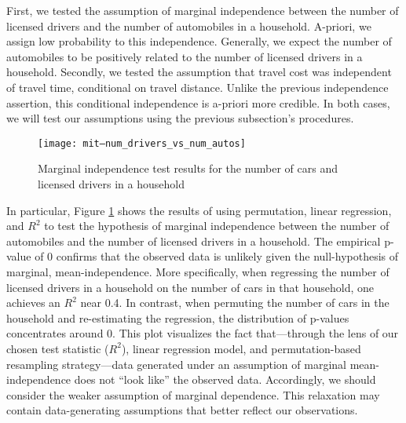 First, we tested the assumption of marginal independence between the number of licensed drivers and the number of automobiles in a household.
A-priori, we assign low probability to this independence.
Generally, we expect the number of automobiles to be positively related to the number of licensed drivers in a household.
Secondly, we tested the assumption that travel cost was independent of travel time, conditional on travel distance.
Unlike the previous independence assertion, this conditional independence is a-priori more credible.
In both cases, we will test our assumptions using the previous subsection's procedures.

\begin{figure}
   \centering
   \texttt{[image: mit--num\_drivers\_vs\_num\_autos]}
   \caption{Marginal independence test results for the number of cars and licensed drivers in a household}
   \label{fig:marginal-independence-test}
\end{figure}

In particular, Figure \ref{fig:marginal-independence-test} shows the results of using permutation, linear regression, and $R^2$ to test the hypothesis of marginal independence between the number of automobiles and the number of licensed drivers in a household.
The empirical p-value of 0 confirms that the observed data is unlikely given the null-hypothesis of marginal, mean-independence.
More specifically, when regressing the number of licensed drivers in a household on the number of cars in that household, one achieves an $R^2$ near 0.4.
In contrast, when permuting the number of cars in the household and re-estimating the regression, the distribution of p-values concentrates around 0.
This plot visualizes the fact that---through the lens of our chosen test statistic ($R^2$), linear regression model, and permutation-based resampling strategy---data generated under an assumption of marginal mean-independence does not ``look like'' the observed data.
Accordingly, we should consider the weaker assumption of marginal dependence.
This relaxation may contain data-generating assumptions that better reflect our observations.

